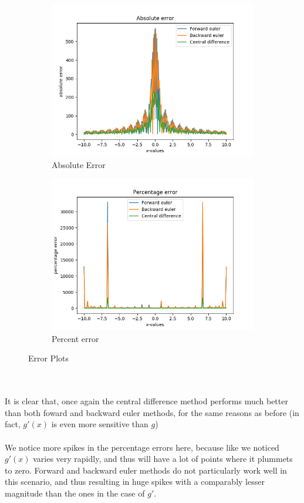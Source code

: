 \documentclass[12pt]{article}
\begin{document}
\begin{figure}[h]
	\centering
	\begin{subfigure}[h]{0.40\textwidth}
		\centering
		\includegraphics[width=\textwidth]{gdprimeabserror.png}
		\caption{Absolute Error }
	\end{subfigure}
	\begin{subfigure}[h]{0.40\textwidth}
		\centering
		\includegraphics[width=\textwidth]{gdprimepercenterror.png}
		\caption{Percent error}
	\end{subfigure}
	\caption{Error Plots}
\end{figure}\\\\
It is clear that, once again the central difference method performs much better than both foward and backward euler methods, for the same reasons as before (in fact, $g'(x)$ is even more sensitive than $g$)\\\\
We notice more spikes in the percentage errors here, because like we noticed $g'(x)$ varies very rapidly, and thus will have a lot of points where it plummets to zero. Forward and backward euler methods do not particularly work well in this scenario, and thus resulting in huge spikes with a comparably lesser magnitude than the ones in the case of $g'$. 
\end{document}
